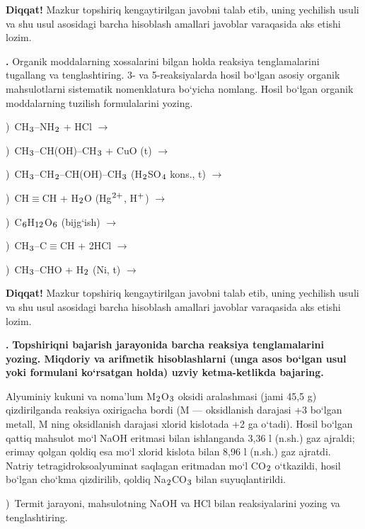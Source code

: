 \documentclass[11pt,a4paper]{article}
\renewcommand{\textsubscript}[1]{\ensuremath{_{\text{\fontsize{8}{8}\selectfont #1}}}}
\renewcommand{\textsuperscript}[1]{\ensuremath{^{\text{\fontsize{8}{8}\selectfont #1}}}}
\newcommand{\qn}[1]{\textbf{\fontsize{11.5}{13}\selectfont #1}}
\newcommand{\qsep}{\par\vspace{13pt}}
\newcommand{\diqqat}[1]{\par\smallskip\noindent\textbf{Diqqat!} #1\par\medskip}
\begin{document}
\diqqat{Mazkur topshiriq kengaytirilgan javobni talab etib, uning yechilish usuli va shu usul asosidagi barcha hisoblash amallari javoblar varaqasida aks etishi lozim.}\qsep
\noindent\qn{42.} Organik moddalarning xossalarini bilgan holda reaksiya tenglamalarini tugallang va tenglashtiring. 3- va 5-reaksiyalarda hosil bo`lgan asosiy organik mahsulotlarni sistematik nomenklatura bo`yicha nomlang. Hosil bo`lgan organik moddalarning tuzilish formulalarini yozing.\par
{})\ CH\textsubscript{3}--NH\textsubscript{2} + HCl $\to$\par
{})\ CH\textsubscript{3}--CH(OH)--CH\textsubscript{3} + CuO (t) $\to$\par
{})\ CH\textsubscript{3}--CH\textsubscript{2}--CH(OH)--CH\textsubscript{3} (H\textsubscript{2}SO\textsubscript{4} kons., t) $\to$\par
{})\ CH$\equiv$CH + H\textsubscript{2}O (Hg\textsuperscript{2+}, H\textsuperscript{+}) $\to$\par
{})\ C\textsubscript{6}H\textsubscript{12}O\textsubscript{6} (bijg`ish) $\to$\par
{})\ CH\textsubscript{3}--C$\equiv$CH + 2HCl $\to$\par
{})\ CH\textsubscript{3}--CHO + H\textsubscript{2} (Ni, t) $\to$\par
\diqqat{Mazkur topshiriq kengaytirilgan javobni talab etib, uning yechilish usuli va shu usul asosidagi barcha hisoblash amallari javoblar varaqasida aks etishi lozim.}\qsep
\noindent\qn{43.} \textbf{Topshiriqni bajarish jarayonida barcha reaksiya tenglamalarini yozing. Miqdoriy va arifmetik hisoblashlarni (unga asos bo`lgan usul yoki formulani ko`rsatgan holda) uzviy ketma-ketlikda bajaring.}\par\smallskip
Alyuminiy kukuni va noma'lum M\textsubscript{2}O\textsubscript{3} oksidi aralashmasi (jami 45,5 g) qizdirilganda reaksiya oxirigacha bordi (M --- oksidlanish darajasi +3 bo`lgan metall, M ning oksidlanish darajasi xlorid kislotada +2 ga o`tadi). Hosil bo`lgan qattiq mahsulot mo`l NaOH eritmasi bilan ishlanganda 3,36 l (n.sh.) gaz ajraldi; erimay qolgan qoldiq esa mo`l xlorid kislota bilan 8,96 l (n.sh.) gaz ajratdi. Natriy tetragidroksoalyuminat saqlagan eritmadan mo`l CO\textsubscript{2} o`tkazildi, hosil bo`lgan cho`kma qizdirilib, qoldiq Na\textsubscript{2}CO\textsubscript{3} bilan suyuqlantirildi.\par
{})\ Termit jarayoni, mahsulotning NaOH va HCl bilan reaksiyalarini yozing va tenglashtiring.\par
\end{document}
